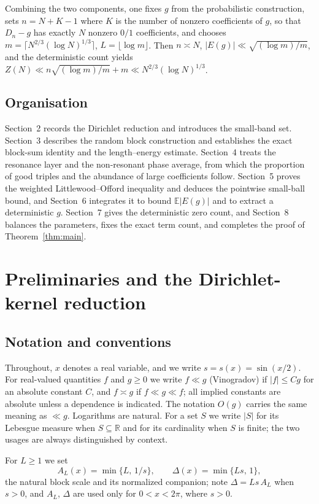 \documentclass[11pt,reqno]{amsart}
\theoremstyle{plain}
\theoremstyle{definition}
\theoremstyle{remark}
\begin{document}
Combining the two components, one fixes $g$ from the probabilistic construction, sets $n=N+K-1$ where $K$ is the number of nonzero coefficients of $g$, so that $D_n-g$ has exactly $N$ nonzero $0/1$ coefficients, and chooses $m=\lceil N^{2/3}(\log N)^{1/3}\rceil$, $L=\lfloor\log m\rfloor$. Then $n\asymp N$, $\lvert E(g)\rvert\ll\sqrt{(\log m)/m}$, and the deterministic count yields $Z(N)\ll n\sqrt{(\log m)/m}+m\ll N^{2/3}(\log N)^{1/3}$.

\subsection*{Organisation}
Section~2 records the Dirichlet reduction and introduces the small-band set. Section~3 describes the random block construction and establishes the exact block-sum identity and the length--energy estimate. Section~4 treats the resonance layer and the non-resonant phase average, from which the proportion of good triples and the abundance of large coefficients follow. Section~5 proves the weighted Littlewood--Offord inequality and deduces the pointwise small-ball bound, and Section~6 integrates it to bound $\mathbb{E}\lvert E(g)\rvert$ and to extract a deterministic $g$. Section~7 gives the deterministic zero count, and Section~8 balances the parameters, fixes the exact term count, and completes the proof of Theorem~\ref{thm:main}.

\section{Preliminaries and the Dirichlet-kernel reduction}

\subsection*{Notation and conventions}

Throughout, $x$ denotes a real variable, and we write $s=s(x)=\sin(x/2)$. For real-valued quantities $f$ and $g\ge 0$ we write $f\ll g$ (Vinogradov) if $|f|\le C g$ for an absolute constant $C$, and $f\asymp g$ if $f\ll g\ll f$; all implied constants are absolute unless a dependence is indicated. The notation $O(g)$ carries the same meaning as $\ll g$. Logarithms are natural. For a set $S$ we write $|S|$ for its Lebesgue measure when $S\subseteq\mathbb{R}$ and for its cardinality when $S$ is finite; the two usages are always distinguished by context.

For $L\ge 1$ we set
\[
A_L(x)=\min\{L,\,1/s\},\qquad \Delta(x)=\min\{Ls,\,1\},
\]
the natural block scale and its normalized companion; note $\Delta=Ls\,A_L$ when $s>0$, and $A_L$, $\Delta$ are used only for $0<x<2\pi$, where $s>0$.
\end{document}
